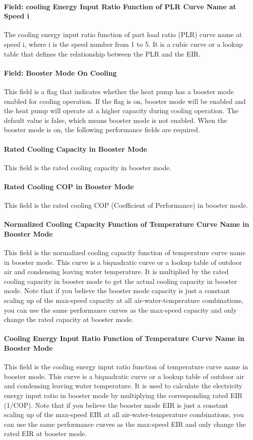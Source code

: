 \paragraph{Field: cooling Energy Input Ratio Function of PLR Curve Name at Speed
i} The cooling energy input ratio function of part load ratio (PLR) curve name
at speed i, where i is the speed number from 1 to 5. It is a cubic curve or a
lookup table that defines the relationship between the PLR and the EIR.
\paragraph{Field: Booster Mode On Cooling} This field is a flag that indicates
whether the heat pump has a booster mode enabled for cooling operation. If the
flag is on, booster mode will be enabled and the heat pump will operate at a
higher capacity during cooling operation. The default value is false, which
means booster mode is not enabled. When the booster mode is on, the following
performance fields are required.
\paragraph{Rated Cooling Capacity in Booster Mode} This field is the rated
cooling capacity in booster mode.
\paragraph{Rated Cooling COP in Booster Mode} This field is the rated cooling
COP (Coefficient of Performance) in booster mode.
\paragraph{Normalized Cooling Capacity Function of Temperature Curve Name in
Booster Mode} This field is the normalized cooling capacity function of
temperature curve name in booster mode. This curve is a biquadratic curve or a
lookup table of outdoor air and condensing leaving water temperature. It is
multiplied by the rated cooling capacity in booster mode to get the actual
cooling capacity in booster mode. Note that if you believe the booster mode
capacity is just a constant scaling up of the max-speed capacity at all
air-water-temperature combinations, you can use the same performance curves as
the max-speed capacity and only change the rated capacity at booster mode.
\paragraph{Cooling Energy Input Ratio Function of Temperature Curve Name in
Booster Mode} This field is the cooling energy input ratio function of
temperature curve name in booster mode. This curve is a biquadratic curve or a
lookup table of outdoor air and condensing leaving water temperature. It is used
to calculate the electricity energy input ratio in booster mode by multiplying
the corresponding rated EIR (1/COP). Note that if you believe the booster mode
EIR is just a constant scaling up of the max-speed EIR at all
air-water-temperature combinations, you can use the same performance curves as
the max-speed EIR and only change the rated EIR at booster mode.

